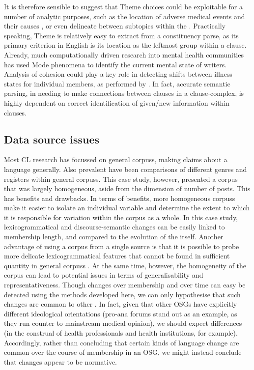 %
\noindent It is therefore sensible to suggest that \gls{Theme} choices could be exploitable for a number of analytic purposes, such as the location of adverse medical events and their causes \cite{chee2011predicting}, or even delineate between subtopics within the . Practically speaking, Theme is relatively easy to extract from a constituency parse, as its primary criterion in English is its location as the leftmost group within a clause. Already, much computationally driven research into mental health communities has used Mode phenomena to identify the current mental state of writers. Analysis of cohesion could play a key role in detecting shifts between illness states for individual members, as performed by \textcite{maclean_forum77:_2015}. In fact, accurate semantic parsing, in needing to make connections between clauses in a clause\hyp{}complex, is highly dependent on correct identification of given\slash new information within clauses.


\subsection{Data source issues}

Most \gls{CL} research has focussed on general \glspl{corpus}, making claims about a language generally. Also prevalent have been comparisons of different genres and registers within general \glspl{corpus}. This case study, however, presented a \gls{corpus} that was largely homogeneous, aside from the dimension of number of \glspl{post}. This has benefits and drawbacks. In terms of benefits, more homogeneous \glspl{corpus} make it easier to isolate an individual variable and determine the extent to which it is responsible for variation within the corpus as a whole. In this case study, lexicogrammatical and \gls{discourse-semantic} changes can be easily linked to membership length, and compared to the evolution of the  itself. Another advantage of using a \gls{corpus} from a single source is that it is possible to probe more delicate lexicogrammatical features that cannot be found in sufficient quantity in general \glspl{corpus} \cite{zinn_changing_2015}. At the same time, however, the homogeneity of the corpus can lead to potential issues in terms of generalisability and representativeness. Though changes over membership and over time can easy be detected using the methods developed here, we can only hypothesise that such changes are common to other . In fact, given that other \glspl{OSG} have explicitly different ideological orientations (pro\hyp{}ana \glspl{forum} stand out as an example, as they run counter to mainstream medical opinion), we should expect differences (in the construal of health professionals and health institutions, for example). Accordingly, rather than concluding that certain kinds of language change are common over the course of membership in an \gls{OSG}, we might instead conclude that changes appear to be normative.

